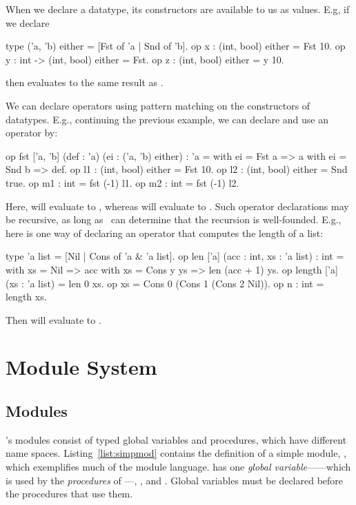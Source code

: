 When we declare a datatype, its constructors are available to
us as values. E.g, if we declare
\begin{easycrypt}{}{}
type ('a, 'b) either = [Fst of 'a | Snd of 'b].
op x : (int, bool) either = Fst 10.
op y : int -> (int, bool) either = Fst.
op z : (int, bool) either = y 10.
\end{easycrypt}
then  evaluates to the same result as .

We can declare operators using pattern matching on the constructors
of datatypes. E.g., continuing the previous example, we can
declare and use an operator  by:
\begin{easycrypt}{}{}
op fst ['a, 'b] (def : 'a) (ei : ('a, 'b) either) : 'a =
  with ei = Fst a => a
  with ei = Snd b => def.
op l1 : (int, bool) either = Fst 10.
op l2 : (int, bool) either = Snd true.
op m1 : int = fst (-1) l1.
op m2 : int = fst (-1) l2.
\end{easycrypt}
Here,  will evaluate to , whereas  will
evaluate to .
Such operator declarations may be recursive, as long as \EasyCrypt\
can determine that the recursion is well-founded. E.g., here is one
way of declaring an operator \ec{length} that computes the length
of a list:
\begin{easycrypt}{}{}
type 'a list = [Nil | Cons of 'a & 'a list].
op len ['a] (acc : int, xs : 'a list) : int =
  with xs = Nil => acc
  with xs = Cons y ys => len (acc + 1) ys.
op length ['a] (xs : 'a list) = len 0 xs.
op xs = Cons 0 (Cons 1 (Cons 2 Nil)).
op n : int = length xs.
\end{easycrypt}
Then  will evaluate to .

\section{Module System}

\subsection{Modules}

\EasyCrypt's modules consist of typed global variables and procedures,
which have different name spaces.
Listing~\ref{list:simpmod} contains the definition of a simple module,
\ec{M}, which exemplifies much of the module language.
 has one \emph{global variable}------which is used by the
\emph{procedures} of \ec{M}---\ec{init}, \ec{incr}, \ec{get} and
\ec{main}. Global variables must be declared before the procedures
that use them.

